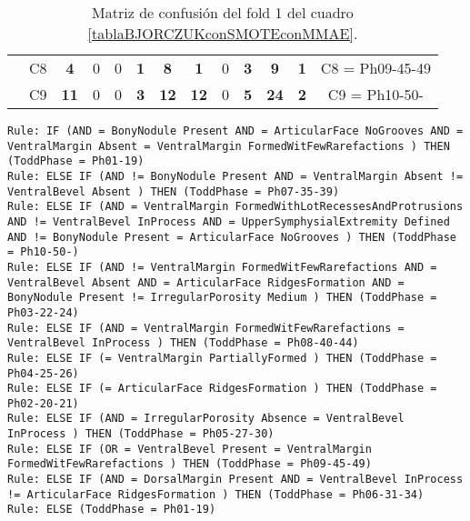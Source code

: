 \begin{table}[H]
{\begin{tabular}{|ccrrrrrrrrrrc|}
\multicolumn{1}{|c|}{}                                      & \multicolumn{1}{c|}{C8} & \multicolumn{1}{c|}{\textbf{4}}  & \multicolumn{1}{c|}{0}          & \multicolumn{1}{c|}{0}          & \multicolumn{1}{c|}{\textbf{1}} & \multicolumn{1}{c|}{\textbf{8}}  & \multicolumn{1}{c|}{\textbf{1}}  & \multicolumn{1}{c|}{0}          & \multicolumn{1}{c|}{\textbf{3}} & \multicolumn{1}{c|}{\textbf{9}}  & \multicolumn{1}{c|}{\textbf{1}} & C8 = Ph09-45-49   \\ \cline{2-13}
\multicolumn{1}{|c|}{}                                      & \multicolumn{1}{c|}{C9} & \multicolumn{1}{c|}{\textbf{11}} & \multicolumn{1}{c|}{0}          & \multicolumn{1}{c|}{0}          & \multicolumn{1}{c|}{\textbf{3}} & \multicolumn{1}{c|}{\textbf{12}} & \multicolumn{1}{c|}{\textbf{12}} & \multicolumn{1}{c|}{0}          & \multicolumn{1}{c|}{\textbf{5}} & \multicolumn{1}{c|}{\textbf{24}} & \multicolumn{1}{c|}{\textbf{2}} & C9 = Ph10-50-     \\ \hline
\end{tabular}%
}
\caption{Matriz de confusión del fold 1 del cuadro \ref{tablaBJORCZUKconSMOTEconMMAE}.}
\end{table}


\begin{lstlisting}
Rule: IF (AND = BonyNodule Present AND = ArticularFace NoGrooves AND = VentralMargin Absent = VentralMargin FormedWitFewRarefactions ) THEN (ToddPhase = Ph01-19)
Rule: ELSE IF (AND != BonyNodule Present AND = VentralMargin Absent != VentralBevel Absent ) THEN (ToddPhase = Ph07-35-39)
Rule: ELSE IF (AND = VentralMargin FormedWithLotRecessesAndProtrusions AND != VentralBevel InProcess AND = UpperSymphysialExtremity Defined AND != BonyNodule Present = ArticularFace NoGrooves ) THEN (ToddPhase = Ph10-50-)
Rule: ELSE IF (AND != VentralMargin FormedWitFewRarefactions AND = VentralBevel Absent AND = ArticularFace RidgesFormation AND = BonyNodule Present != IrregularPorosity Medium ) THEN (ToddPhase = Ph03-22-24)
Rule: ELSE IF (AND = VentralMargin FormedWitFewRarefactions = VentralBevel InProcess ) THEN (ToddPhase = Ph08-40-44)
Rule: ELSE IF (= VentralMargin PartiallyFormed ) THEN (ToddPhase = Ph04-25-26)
Rule: ELSE IF (= ArticularFace RidgesFormation ) THEN (ToddPhase = Ph02-20-21)
Rule: ELSE IF (AND = IrregularPorosity Absence = VentralBevel InProcess ) THEN (ToddPhase = Ph05-27-30)
Rule: ELSE IF (OR = VentralBevel Present = VentralMargin FormedWitFewRarefactions ) THEN (ToddPhase = Ph09-45-49)
Rule: ELSE IF (AND = DorsalMargin Present AND = VentralBevel InProcess != ArticularFace RidgesFormation ) THEN (ToddPhase = Ph06-31-34)
Rule: ELSE (ToddPhase = Ph01-19)
\end{lstlisting}


